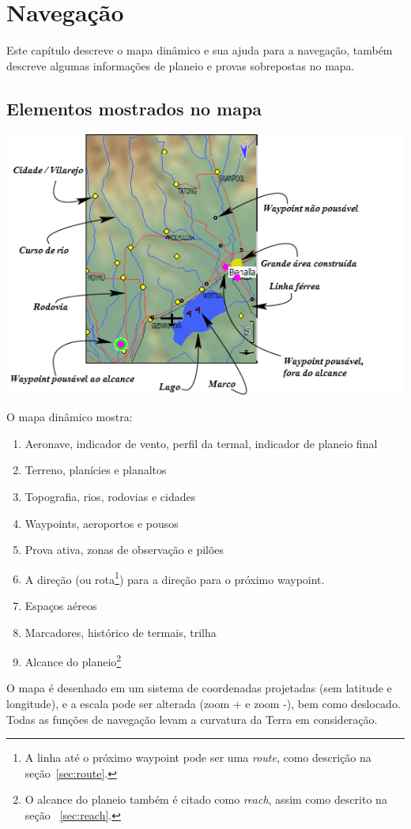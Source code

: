 \chapter{Navegação}\label{cha:navigation}
Este capítulo descreve o mapa dinâmico e sua ajuda para a navegação, também descreve algumas informações de planeio e provas sobrepostas no mapa.

\section{Elementos mostrados no mapa}

\begin{maxipage}
\includegraphics[angle=0,width=0.9\linewidth,keepaspectratio='true']{figures/fig-map.png}
\end{maxipage}

O mapa dinâmico mostra: 
\begin{enumerate} 
\item Aeronave, indicador de vento, perfil da termal, indicador de planeio final
\item Terreno, planícies e planaltos
\item Topografia, rios, rodovias e cidades
\item Waypoints, aeroportos e pousos
\item Prova ativa, zonas de observação e pilões
\item A direção (ou rota\footnote {A linha até o próximo waypoint pode ser uma {\em route}, como descrição na seção~\ref{sec:route}.}) para a direção para o próximo waypoint.
\item Espaços aéreos
\item Marcadores, histórico de termais, trilha
\item Alcance do planeio\footnote{O alcance do planeio também é citado como
  {\em reach}, assim como descrito na seção ~\ref{sec:reach}.}
\end{enumerate}
O mapa é desenhado em um sistema de coordenadas projetadas (sem latitude e longitude), e a escala pode ser alterada (zoom + e zoom -), bem como deslocado.  Todas as funções de navegação levam a curvatura da Terra em consideração.

